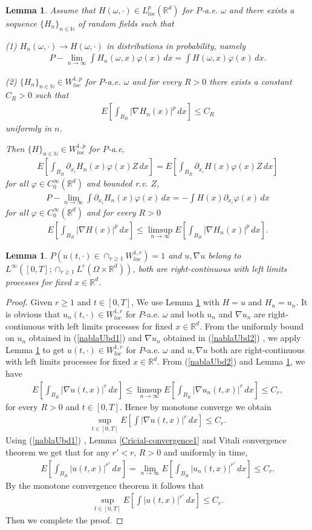 \documentclass[12pt,oneside, reqno]{amsart}
\newcommand{\be}{\begin{eqnarray}}
\newcommand{\ee}{\end{eqnarray}}
\newcommand{\ce}{\begin{eqnarray*}}
\newcommand{\de}{\end{eqnarray*}}
\newtheorem{lemma}[theorem]{Lemma}
\def\mN{{\mathbb N}}
\def\mR{{\mathbb R}}
\def\geq{\geqslant}
\def\leq{\leqslant}
\numberwithin{equation}{section}
\begin{document}
\begin{lemma}\label{regular-lemma1}
	Assume that $H(\omega,\cdot)\in L_{loc}^p(\mR^d)$ for $P$-a.e. $\omega$ and there exists a sequence $\{H_n\}_{n\in\mN}$ of random fields such that 
	
	(1) $H_n(\omega,\cdot)\to H(\omega,\cdot)$ in distributions in probability, namely
	\ce 
	P-\lim_{n\to\infty}\int H_n(\omega,x)\varphi(x)\,dx=\int H(\omega,x)\varphi(x)\,dx.
	\de 
	
	(2) $\{H_n\}_{n\in\mN}\in W_{loc}^{1,p}$  for $P$-a.e. $\omega$ and for every $R>0$ there exists a constant $C_R>0$ such that 
	\ce 
	E\left[\int_{B_R}|\nabla H_n(x)|^p\,dx\right]\leq C_R
	\de 
	uniformly in $n$.
	
	Then $\{H\}_{n\in\mN}\in W_{loc}^{1,p}$  for $P$-a.e,
	\ce 
		E\left[\int_{B_R}\partial_{x_i} H_n(x)\varphi(x)Z\,dx\right]=E\left[\int_{B_R}\partial_{x_i} H(x)\varphi(x)Z\,dx\right]
	\de 
	for all $\varphi\in C_0^{\infty}(\mR^d)$ and bounded r.v. $Z$,
		\ce 
P-\lim_{n\to\infty}\int\partial_{x_i} H_n(x)\varphi(x)\,dx=-\int H(x)\partial_{x_i}\varphi(x)\,dx
	\de 
		for all $\varphi\in C_0^{\infty}(\mR^d)$ and for every $R>0$
	\ce 
	E\left[\int_{B_R}|\nabla H(x)|^p\,dx\right]\leq \limsup_{n\to\infty}	E\left[\int_{B_R}|\nabla H_n(x)|^p\,dx\right].
	\de 
\end{lemma}

\begin{lemma}\label{regular-solution-lemma}
	$P(u(t,\cdot)\in \cap_{r\geq 1}W_{loc}^{1,r})=1$  and $u, \nabla u$ belong to $L^{\infty}([0,T];\cap_{r\geq 1}L^r(\Omega\times \mR^d))$,  both are right-continuous with left limits processes for fixed $x\in\mR^d$.
\end{lemma}
\begin{proof}
Given $r\geq 1$ and $t\in[0,T]$, We  use Lemma \ref{regular-lemma1} with $H=u$ and $H_n=u_n$. It is obvious that $u_n(t,\cdot)\in W_{loc}^{1,r}$ for $P$-a.e. $\omega$ and both $u_n$ and $\nabla u_n$   are right-continuous with left limits processes for fixed $x\in\mR^d$. From the uniformly bound on $ u_n$ obtained in (\ref{nablaUbd1}) and $\nabla u_n$ obtained in (\ref{nablaUbd2}) , we apply Lemma \ref{regular-lemma1} to get $u(t,\cdot)\in W_{loc}^{1,r}$ for $P$-a.e. $\omega$ and $u, \nabla u$ both are right-continuous with left limits processes for fixed $x\in\mR^d$. From (\ref{nablaUbd2}) and Lemma \ref{regular-lemma1}, we have 
\ce 
E\left[\int_{B_R}|\nabla u(t,x)|^r\,dx\right]\leq \limsup_{n\to\infty}E\left[\int_{B_R}|\nabla u_n(t,x)|^r\,dx\right]\leq C_r,
\de 
for every $R>0$ and $t\in[0,T]$. Hence by monotone converge we obtain
\be\label{bound-bound1}
\sup_{t\in[0,T]}E\left[\int |\nabla u(t,x)|^r\,dx\right]\leq C_r.
\ee 
Using (\ref{nablaUbd1}) , Lemma \ref{Cricial-convergence1} and Vitali convergence theorem we get that for any $r'<r$, $R>0$ and uniformly in time, 
\ce 
E\left[\int_{B_R}| u(t,x)|^{r'}\,dx\right]=\lim_{n\to\infty}E\left[\int_{B_R}| u_n(t,x)|^{r'}\,dx\right]\leq C_r.
\de 
By the monotone convergence theorem it follows that 
\be \label{estimate-solution22}
\sup_{t\in[0,T]}E\left[\int| u(t,x)|^{r'}\,dx\right]\leq C_r.
\ee 
Then we complete the proof.
\end{proof}
\end{document}
